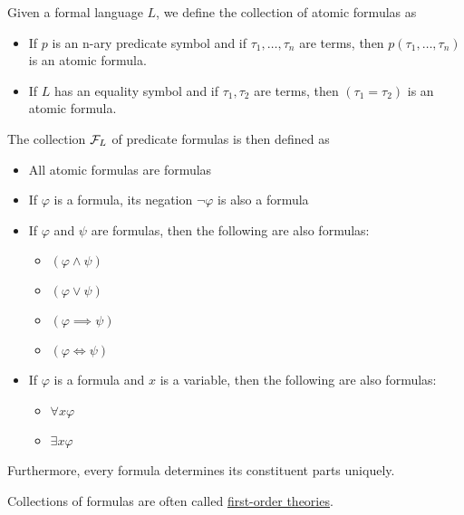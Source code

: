 \begin{definition}\label{def:first_order_formulas}\cite[20]{Lectures:logic_programming}
  Given a formal language $L$, we define the collection of atomic formulas as
  \begin{itemize}
    \item If $p$ is an n-ary predicate symbol and if $\tau_1, \ldots, \tau_n$ are terms, then $p(\tau_1, \ldots, \tau_n)$ is an atomic formula.
    \item If $L$ has an equality symbol and if $\tau_1, \tau_2$ are terms, then $(\tau_1 = \tau_2)$ is an atomic formula.
  \end{itemize}

  The collection $\mathcal F_L$ of predicate formulas is then defined as
  \begin{itemize}
    \item All atomic formulas are formulas
    \item If $\varphi$ is a formula, its negation $\neg \varphi$ is also a formula
    \item If $\varphi$ and $\psi$ are formulas, then the following are also formulas:
    \begin{itemize}
      \item $(\varphi \land \psi)$
      \item $(\varphi \lor \psi)$
      \item $(\varphi \implies \psi)$
      \item $(\varphi \iff \psi)$
    \end{itemize}
    \item If $\varphi$ is a formula and $x$ is a variable, then the following are also formulas:
    \begin{itemize}
      \item $\forall x \varphi$
      \item $\exists x \varphi$
    \end{itemize}
  \end{itemize}

  Furthermore, every formula determines its constituent parts uniquely.

  Collections of formulas are often called \uline{first-order theories}.


\end{definition}
